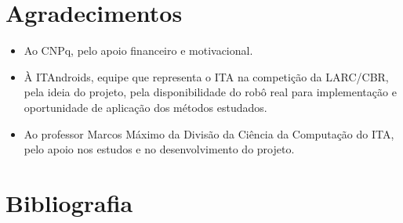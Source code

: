 \documentclass[a4paper,12pt]{article}
\begin{document}
\section{Agradecimentos}

\begin{itemize}
\item Ao CNPq, pelo apoio financeiro e motivacional.
\item À ITAndroids, equipe que representa o ITA na competição da LARC/CBR, pela ideia do projeto, pela disponibilidade do robô real para implementação e oportunidade de aplicação dos métodos estudados.
\item Ao professor Marcos Máximo da Divisão da Ciência da Computação do ITA, pelo apoio nos estudos e no desenvolvimento do projeto.

\end{itemize}

\section{Bibliografia}


\printbibliography[heading=none]
\end{document}
